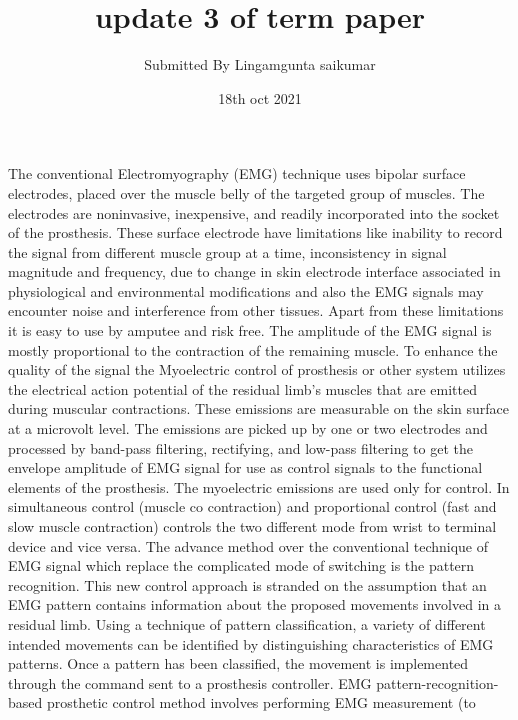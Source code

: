 \documentclass{article}
\title{update 3 of term paper}
\author{Submitted By Lingamgunta saikumar}
\date{18th oct 2021}
\begin{document}
\maketitle

\section{}
The conventional Electromyography (EMG) technique uses bipolar surface electrodes, placed over 
the muscle belly of the targeted group of muscles. The electrodes are noninvasive, inexpensive, and 
readily incorporated into the socket of the prosthesis. These surface electrode have limitations like 
inability to record the signal from different muscle group at a time, inconsistency in signal magnitude 
and frequency, due to change in skin electrode interface associated in physiological and 
environmental modifications and also the EMG signals may encounter noise and interference from 
other tissues. Apart from these limitations it is easy to use by amputee and risk free. The amplitude 
of the EMG signal is mostly proportional to the contraction of the remaining muscle. To enhance the 
quality of the signal the Myoelectric control of prosthesis or other system utilizes the electrical 
action potential of the residual limb’s muscles that are emitted during muscular contractions. These 
emissions are measurable on the skin surface at a microvolt level. The emissions are picked up by 
one or two electrodes and processed by band-pass filtering, rectifying, and low-pass filtering to get 
the envelope amplitude of EMG signal for use as control signals to the functional elements of the 
prosthesis. The myoelectric emissions are used only for control. In simultaneous control (muscle co 
contraction) and proportional control (fast and slow muscle contraction) controls the two different 
mode from wrist to terminal device and vice versa.
The advance method over the conventional technique of EMG signal which replace the complicated 
mode of switching is the pattern recognition. This new control approach is stranded on the 
assumption that an EMG pattern contains information about the proposed movements involved in a 
residual limb. Using a technique of pattern classification, a variety of different intended movements 
can be identified by distinguishing characteristics of EMG patterns. Once a pattern has been 
classified, the movement is implemented through the command sent to a prosthesis controller. EMG 
pattern-recognition-based prosthetic control method involves performing EMG measurement (to 
\end{document}
